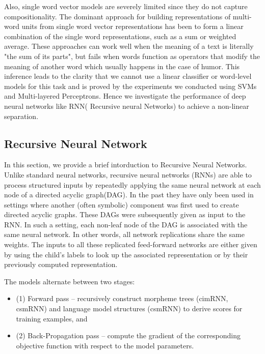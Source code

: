 \documentclass{acm_proc_article-sp}
\begin{document}
Also, single word vector models are severely limited since they do not capture compositionality. The dominant approach for building representations  of multi-word units from single word vector representations has been to form a linear combination of the single word representations, such as a sum or weighted average.  These approaches can work well when the meaning of a text is literally "the sum of its parts", but fails when words function as operators that modify the meaning of another word which usually happens in the case of humor. This inference leads to the clarity that we cannot use a linear classifier or word-level models for this task and is proved by the experiments we conducted using SVMs and Multi-layered Perceptrons. Hence we investigate the performance of deep neural networks like RNN( Recursive neural Networks) to achieve a non-linear separation.

\subsection{Recursive Neural Network}

In this section, we provide a brief intorduction to Recursive Neural Networks. Unlike standard neural networks, recursive neural networks (RNNs) are able to process structured inputs by repeatedly applying the same neural network at each node of a directed acyclic graph(DAG). In the past they have only been used in settings where another (often symbolic) component was first used to create directed acyclic graphs. These DAGs were subsequently given as input to the RNN. In such a setting, each non-leaf node of the DAG is associated with the same neural network. In other words, all network replications share the same weights. The inputs to all these replicated feed-forward networks are either given by using the child's labels to look up the associated representation or by their previously computed representation. 

The models alternate between two stages:
\begin{itemize} 
\item (1) Forward pass – recursively construct morpheme trees (cimRNN, csmRNN) and language model structures (csmRNN) to derive scores for training examples, and 

\item (2) Back-Propagation pass – compute the gradient of the corresponding objective function with respect to the model parameters.
\end{itemize}
\end{document}
